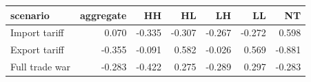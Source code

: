 \begin{tabular}{lrrrrrr}
\toprule
scenario & aggregate & HH & HL & LH & LL & NT \\
\midrule
Import tariff & 0.070 & -0.335 & -0.307 & -0.267 & -0.272 & 0.598 \\
Export tariff & -0.355 & -0.091 & 0.582 & -0.026 & 0.569 & -0.881 \\
Full trade war & -0.283 & -0.422 & 0.275 & -0.289 & 0.297 & -0.283 \\
\bottomrule
\end{tabular}
